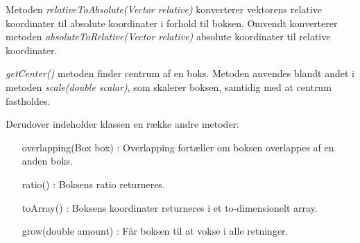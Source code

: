 Metoden \emph{relativeToAbsolute(Vector relative)} konverterer vektorens relative koordinater til absolute koordinater i forhold til boksen. Omvendt konverterer metoden \emph{absoluteToRelative(Vector relative)} absolute koordinater til relative koordinater.

\emph{getCenter()} metoden finder centrum af en boks. Metoden anvendes blandt andet i metoden \emph{scale(double scalar)}, som skalerer boksen, samtidig med at centrum fastholdes.

Derudover indeholder klassen en række andre metoder:

\begin{itemize}
	\item [overlapping(Box box)]: Overlapping fortæller om boksen overlappes af en anden boks.
	\item [ratio()]: Boksens ratio returneres.
	\item [toArray()]: Boksens koordinater returneres i et to-dimensionelt array.
	\item [grow(double amount)]: Får boksen til at vokse i alle retninger.
\end{itemize}